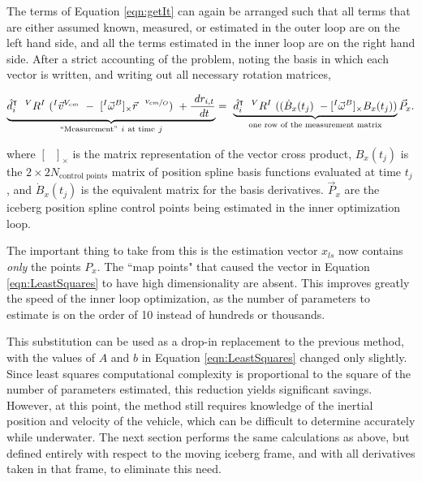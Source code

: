 The terms of Equation \ref{eqn:getIt} can again be arranged such that all terms that are either assumed known, measured, or estimated in the outer loop are on the left hand side, and all the terms estimated in the inner loop are on the right hand side. After a strict accounting of the problem, noting the basis in which each vector is written, and writing out all necessary rotation matrices,

\begin{equation}
 \underbrace{\hat{d}_i^{\intercal}~~^{V}R^I ~(^{I}\vec{v}^{V_{cm}} ~-~[^{I}\vec{\omega}^{B}]_\times\vec{r}^{~~\nicefrac{V_{cm}}{O}}) ~+
 \frac{~dr_{i,t}}{~dt} }_{``\text{Measurement}" ~i ~\text{at time}~ j}
  =~\underbrace{\hat{d}_i^{\intercal}~~{^{V}R^I} ~((\dot{B}_x(t_j)~-
 [^{I}\vec{\omega}^{B}]_\times B_x(t_j))}_\text{one row of the measurement matrix}\vec{P}_x.
 \label{eqn:finaldvl}
\end{equation}

where $[~~~]_\times$ is the matrix representation of the vector cross product, $B_x(t_j)$ is the $2\times2N_\text{control points}$ matrix of position spline basis functions evaluated at time $t_j$, and $\dot{B}_x(t_j)$ is the equivalent matrix for the basis derivatives. $\vec{P}_x$ are the iceberg position spline control points being estimated in the inner optimization loop.

The important thing to take from this is the estimation vector $x_{ls}$ now contains \emph{only} the points $P_x$. The ``map points" that caused the vector in Equation \ref{eqn:LeastSquares} to have high dimensionality are absent. This improves greatly the speed of the inner loop optimization, as the number of parameters to estimate is on the order of 10 instead of hundreds or thousands.

This substitution can be used as a drop-in replacement to the previous method, with the values of $A$ and $b$ in Equation \ref{eqn:LeastSquares} changed only slightly. Since least squares computational complexity is proportional to the square of the number of parameters estimated, this reduction yields significant savings. However, at this point, the method still requires knowledge of the inertial position and velocity of the vehicle, which can be difficult to determine accurately while underwater. The next section performs the same calculations as above, but defined entirely with respect to the moving iceberg frame, and with all derivatives taken in that frame, to eliminate this need. 



